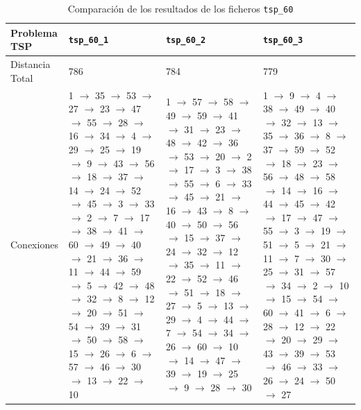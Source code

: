 \documentclass[a4paper,11pt]{article}
\begin{document}
\begin{table}[!htbp]
\label{results_tsp_60}
\centering
\begin{tabularx}{\textwidth}{|p{2cm}|X|X|X|}
\hline
Problema TSP    & \texttt{tsp\_60\_1}   & \texttt{tsp\_60\_2}   & \texttt{tsp\_60\_3}	\\ \hline
Distancia Total & 786   & 784   & 779	\\ \hline
Conexiones	& 1 $\to$ 35 $\to$ 53 $\to$ 27 $\to$ 23 $\to$ 47 $\to$ 55 $\to$ 28 $\to$ 16 $\to$ 34 $\to$ 4 $\to$ 29 $\to$ 25 $\to$ 19 $\to$ 9 $\to$ 43 $\to$ 56 $\to$ 18 $\to$ 37 $\to$ 14 $\to$ 24 $\to$ 52 $\to$ 45 $\to$ 3 $\to$ 33 $\to$ 2 $\to$ 7 $\to$ 17 $\to$ 38 $\to$ 41 $\to$ 60 $\to$ 49 $\to$ 40 $\to$ 21 $\to$ 36 $\to$ 11 $\to$ 44 $\to$ 59 $\to$ 5 $\to$ 42 $\to$ 48 $\to$ 32 $\to$ 8 $\to$ 12 $\to$ 20 $\to$ 51 $\to$ 54 $\to$ 39 $\to$ 31 $\to$ 50 $\to$ 58 $\to$ 15 $\to$ 26 $\to$ 6 $\to$ 57 $\to$ 46 $\to$ 30 $\to$ 13 $\to$ 22 $\to$ 10	& 1 $\to$ 57 $\to$ 58 $\to$ 49 $\to$ 59 $\to$ 41 $\to$ 31 $\to$ 23 $\to$ 48 $\to$ 42 $\to$ 36 $\to$ 53 $\to$ 20 $\to$ 2 $\to$ 17 $\to$ 3 $\to$ 38 $\to$ 55 $\to$ 6 $\to$ 33 $\to$ 45 $\to$ 21 $\to$ 16 $\to$ 43 $\to$ 8 $\to$ 40 $\to$ 50 $\to$ 56 $\to$ 15 $\to$ 37 $\to$ 24 $\to$ 32 $\to$ 12 $\to$ 35 $\to$ 11 $\to$ 22 $\to$ 52 $\to$ 46 $\to$ 51 $\to$ 18 $\to$ 27 $\to$ 5 $\to$ 13 $\to$ 29 $\to$ 4 $\to$ 44 $\to$ 7 $\to$ 54 $\to$ 34 $\to$ 26 $\to$ 60 $\to$ 10 $\to$ 14 $\to$ 47 $\to$ 39 $\to$ 19 $\to$ 25 $\to$ 9 $\to$ 28 $\to$ 30	& 1 $\to$ 9 $\to$ 4 $\to$ 38 $\to$ 49 $\to$ 40 $\to$ 32 $\to$ 13 $\to$ 35 $\to$ 36 $\to$ 8 $\to$ 37 $\to$ 59 $\to$ 52 $\to$ 18 $\to$ 23 $\to$ 56 $\to$ 48 $\to$ 58 $\to$ 14 $\to$ 16 $\to$ 44 $\to$ 45 $\to$ 42 $\to$ 17 $\to$ 47 $\to$ 55 $\to$ 3 $\to$ 19 $\to$ 51 $\to$ 5 $\to$ 21 $\to$ 11 $\to$ 7 $\to$ 30 $\to$ 25 $\to$ 31 $\to$ 57 $\to$ 34 $\to$ 2 $\to$ 10 $\to$ 15 $\to$ 54 $\to$ 60 $\to$ 41 $\to$ 6 $\to$ 28 $\to$ 12 $\to$ 22 $\to$ 20 $\to$ 29 $\to$ 43 $\to$ 39 $\to$ 53 $\to$ 46 $\to$ 33 $\to$ 26 $\to$ 24 $\to$ 50 $\to$ 27	\\ \hline
\end{tabularx}
\caption{Comparación de los resultados de los ficheros \texttt{tsp\_60}}
\end{table}
\end{document}
